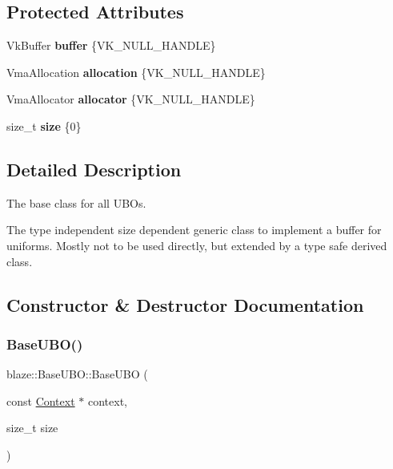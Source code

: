 \subsection*{Protected Attributes}
\begin{DoxyCompactItemize}
\item 
\mbox{\label{classblaze_1_1BaseUBO_a1a8439adc16530d7630ba918251f3f74}} 
Vk\+Buffer {\bfseries buffer} \{V\+K\+\_\+\+N\+U\+L\+L\+\_\+\+H\+A\+N\+D\+LE\}
\item 
\mbox{\label{classblaze_1_1BaseUBO_a14f3711ae432dc6d3dcfc9cc26547152}} 
Vma\+Allocation {\bfseries allocation} \{V\+K\+\_\+\+N\+U\+L\+L\+\_\+\+H\+A\+N\+D\+LE\}
\item 
\mbox{\label{classblaze_1_1BaseUBO_a880896ef02c52bb2d7e4ddd566cd9cab}} 
Vma\+Allocator {\bfseries allocator} \{V\+K\+\_\+\+N\+U\+L\+L\+\_\+\+H\+A\+N\+D\+LE\}
\item 
\mbox{\label{classblaze_1_1BaseUBO_a8e0a6327bf61125c790d5fc036fcef62}} 
size\+\_\+t {\bfseries size} \{0\}
\end{DoxyCompactItemize}


\subsection{Detailed Description}
The base class for all U\+B\+Os. 

The type independent size dependent generic class to implement a buffer for uniforms. Mostly not to be used directly, but extended by a type safe derived class. 

\subsection{Constructor \& Destructor Documentation}
\mbox{\label{classblaze_1_1BaseUBO_abc55449d131e9bb970f057ee129d3728}} 
\subsubsection{\texorpdfstring{Base\+U\+B\+O()}{BaseUBO()}}
{\footnotesize\ttfamily blaze\+::\+Base\+U\+B\+O\+::\+Base\+U\+BO (\begin{DoxyParamCaption}\item[{const \hyperlink{classblaze_1_1Context}{Context} $\ast$}]{context,  }\item[{size\+\_\+t}]{size }\end{DoxyParamCaption})\hspace{0.3cm}{\ttfamily [noexcept]}}



